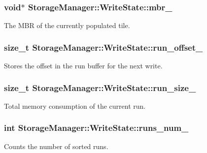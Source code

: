 \subsubsection[{mbr\+\_\+}]{\setlength{\rightskip}{0pt plus 5cm}void$\ast$ Storage\+Manager\+::\+Write\+State\+::mbr\+\_\+}\label{structStorageManager_1_1WriteState_a2f0d2f44d73d97bcbcdb627562f86dce}
The M\+B\+R of the currently populated tile. \hypertarget{structStorageManager_1_1WriteState_a9fac7bc7b5a38477520185f9918a5fce}{}
\subsubsection[{run\+\_\+offset\+\_\+}]{\setlength{\rightskip}{0pt plus 5cm}size\+\_\+t Storage\+Manager\+::\+Write\+State\+::run\+\_\+offset\+\_\+}\label{structStorageManager_1_1WriteState_a9fac7bc7b5a38477520185f9918a5fce}
Stores the offset in the run buffer for the next write. \hypertarget{structStorageManager_1_1WriteState_a9403ab762032eb045a6bd890c42c8aa1}{}
\subsubsection[{run\+\_\+size\+\_\+}]{\setlength{\rightskip}{0pt plus 5cm}size\+\_\+t Storage\+Manager\+::\+Write\+State\+::run\+\_\+size\+\_\+}\label{structStorageManager_1_1WriteState_a9403ab762032eb045a6bd890c42c8aa1}
Total memory consumption of the current run. \hypertarget{structStorageManager_1_1WriteState_a2b66823e9497d9ffdbc4513f5aae4da0}{}
\subsubsection[{runs\+\_\+num\+\_\+}]{\setlength{\rightskip}{0pt plus 5cm}int Storage\+Manager\+::\+Write\+State\+::runs\+\_\+num\+\_\+}\label{structStorageManager_1_1WriteState_a2b66823e9497d9ffdbc4513f5aae4da0}
Counts the number of sorted runs. \hypertarget{structStorageManager_1_1WriteState_a49054392be593764becbff60881c6f70}{}
